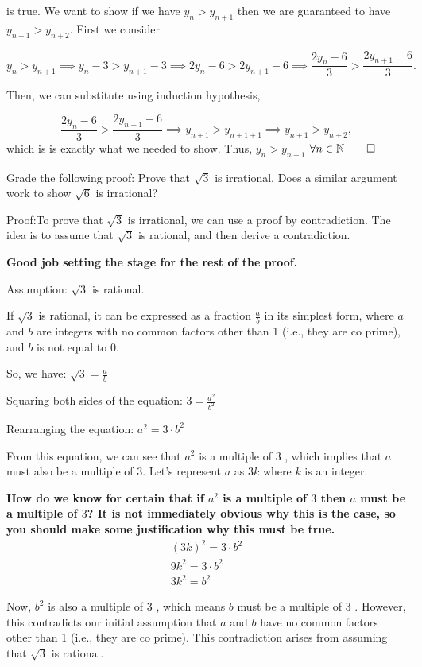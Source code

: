 \documentclass{report}
\begin{document}
is true. We want to show if we have $ y_n > y_{n+1}$ then we are guaranteed to have $y_{n+1} > y_{n+2}$. First we consider

$$y_n > y_{n+1} \implies  y_n -3  >  y_{n+1}-3 \implies  2y_n -6  >  2y_{n+1}-6 \implies \frac{2y_n -6 }{3} >  \frac{2y_{n+1}-6}{3}.$$


Then, we can substitute using induction hypothesis,


$$ \frac{2y_n -6 }{3} >  \frac{2y_{n+1}-6}{3} \implies y_{n+1} > y_{n+1+1} \implies y_{n+1} > y_{n+2},$$ 
which is is exactly what we needed to show. Thus, $ y_{n} > y_{n+1}$ $\forall n \in \mathbb{N} \qed$

\bigskip

\qs{}
{Grade the following proof: Prove that $\sqrt{3}$ is irrational. Does a similar argument work to show $\sqrt{6}$ is irrational?}

Proof:To prove that $\sqrt{3}$ is irrational, we can use a proof by contradiction. The idea is to assume that $\sqrt{3}$ is rational, and then derive a contradiction.

\textbf{Good job setting the stage for the rest of the proof.}

Assumption: $\sqrt{3}$ is rational.

If $\sqrt{3}$ is rational, it can be expressed as a fraction $\frac{a}{b}$ in its simplest form, where $a$ and $b$ are integers with no common factors other than 1 (i.e., they are co prime), and $b$ is not equal to 0.

So, we have: $\sqrt{3}=\frac{a}{b}$

Squaring both sides of the equation: $3=\frac{a^{2}}{b^{2}}$

Rearranging the equation: $a^{2}=3 \cdot b^{2}$

From this equation, we can see that $a^{2}$ is a multiple of 3 , which implies that $a$ must also be a multiple of 3. Let's represent $a$ as $3 k$ where $k$ is an integer:

\textbf{
How do we know for certain  that if $a^2$ is a multiple of  $3$ then $a$ must be a multiple of $3$? It is not immediately obvious why this is the case, so you should make some justification why this must be true.
}
$$
\begin{gathered}
(3 k)^{2}=3 \cdot b^{2} \\
9 k^{2}=3 \cdot b^{2} \\
3 k^{2}=b^{2}
\end{gathered}
$$

Now, $b^{2}$ is also a multiple of 3 , which means $b$ must be a multiple of 3 . However, this contradicts our initial assumption that $a$ and $b$ have no common factors other than 1 (i.e., they are co prime). This contradiction arises from assuming that $\sqrt{3}$ is rational.
\end{document}
